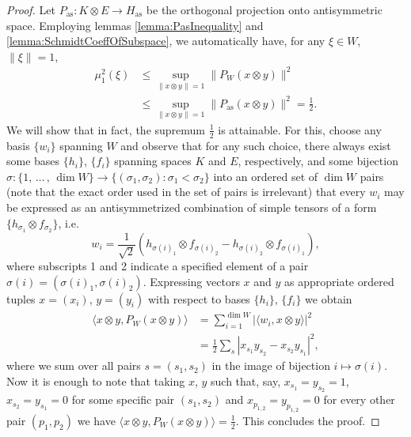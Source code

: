 \documentclass[reqno]{amsart}
\theoremstyle{plain}
\theoremstyle{note}
\newcommand{\aspace}{H_{\mathrm{as}}}
\newcommand{\iprod}[2]{\langle #1 , #2 \rangle}
\begin{document}
\begin{proof}
Let $P_{\mathrm{as}} : K\otimes E \to \aspace$ be the orthogonal projection onto antisymmetric space. Employing lemmas \ref{lemma:PasInequality} and \ref{lemma:SchmidtCoeffOfSubspace}, we automatically have, for any $\xi \in W$, $\|\xi\| = 1$,
\begin{align}
    \mu_{1}^{2}(\xi) &\leqslant \sup_{\|x\otimes y\|=1}{\| P_{W}(x\otimes y) \|^{2}} \\
    &\leqslant \sup_{\|x\otimes y\|=1}{\| P_{\mathrm{as}}(x\otimes y) \|^{2}} = \frac{1}{2}.\nonumber
\end{align}
We will show that in fact, the supremum $\frac{1}{2}$ is attainable. For this, choose any basis $\{w_i\}$ spanning $W$ and observe that for any such choice, there always exist some bases $\{h_i\}$, $\{f_i\}$ spanning spaces $K$ and $E$, respectively, and some bijection $\sigma : \{ 1, \, \ldots \, , \, \dim{W} \} \to \{ (\sigma_1, \sigma_2) : \sigma_1 < \sigma_2 \}$ into an ordered set of $\dim{W}$ pairs (note that the exact order used in the set of pairs is irrelevant) that every $w_i$ may be expressed as an antisymmetrized combination of simple tensors of a form $\{h_{\sigma_1} \otimes f_{\sigma_2}\}$, i.e.
\begin{equation}
    w_i = \frac{1}{\sqrt{2}} \left(h_{\sigma(i)_{1}}\otimes f_{\sigma(i)_{2}} -h_{\sigma(i)_{2}}\otimes f_{\sigma(i)_{1}} \right),
\end{equation}
where subscripts 1 and 2 indicate a specified element of a pair $\sigma(i) = (\sigma(i)_1, \sigma(i)_2)$. Expressing vectors $x$ and $y$ as appropriate ordered tuples $x = (x_i)$, $y = (y_i)$ with respect to bases $\{h_i\}$, $\{f_i\}$ we obtain
\begin{align}
    \langle x\otimes y , P_{W}(x\otimes y) \rangle &= \sum_{i=1}^{\dim{W}} |\iprod{w_i}{x\otimes y}|^{2} \\
    &= \frac{1}{2} \sum_{s} | x_{s_1}y_{s_2} - x_{s_2} y_{s_1} |^{2}, \nonumber
\end{align}
where we sum over all pairs $s = (s_1 , s_2)$ in the image of bijection $i\mapsto \sigma(i)$. Now it is enough to note that taking $x$, $y$ such that, say, $x_{s_1} = y_{s_2} = 1$, $x_{s_2} = y_{s_1} = 0$ for some specific pair $(s_1, s_2)$ and $x_{p_{1,2}} = y_{p_{1,2}} = 0$ for every other pair $(p_1,p_2)$ we have $\langle x\otimes y , P_{W}(x\otimes y) \rangle = \frac{1}{2}$. This concludes the proof.
\end{proof}
\end{document}

